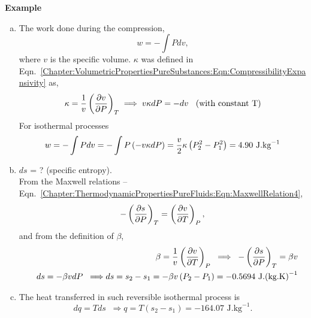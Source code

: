 \begin{MyExample}{\begin{center}{\bf Example}\end{center}}
       \begin{enumerate}[a)]
%
            \item The work done during the compression,
                \begin{displaymath}
                   w = -\int P dv,
                \end{displaymath}
                where $v$ is the specific volume. $\kappa$ was defined in Eqn.~\ref{Chapter:VolumetricPropertiesPureSubstances:Eqn:CompressibilityExpansivity} as,
                \begin{displaymath}
                   \kappa = \displaystyle\frac{1}{v}\left(\displaystyle\frac{\partial v}{\partial P}\right)_{T}\;\Longrightarrow \; v\kappa dP = - dv \;\;\text{ (with constant T)}
                \end{displaymath}
                For isothermal processes
                \begin{displaymath}
                   w = -\int P dv = - \int P\left(-v\kappa dP\right) = \displaystyle\frac{v}{2}\kappa\left(P_{2}^{2}-P_{1}^{2}\right) = 4.90\text{ J.kg}^{-1}
                \end{displaymath}
%
            \item $ds$ = ? (specific entropy).\\
                  From the Maxwell relations -- Eqn.~\ref{Chapter:ThermodynamicPropertiesPureFluids:Eqn:MaxwellRelation4}, 
                \begin{displaymath}
                   -\left(\displaystyle\frac{\partial s}{\partial P}\right)_{T} = \left(\displaystyle\frac{\partial v}{\partial T}\right)_{P},
                \end{displaymath}
                and from the definition of $\beta$,
                \begin{eqnarray}
                    && \beta = \displaystyle\frac{1}{v}\left(\displaystyle\frac{\partial v}{\partial T}\right)_{P} \;\;\Longrightarrow\;\; -\left(\displaystyle\frac{\partial s}{\partial P}\right)_{T} = \beta v \nonumber \\
                    && ds = -\beta v dP \;\;\Longrightarrow ds = s_{2}-s_{1} = -\beta v \left(P_{2}-P_{1}\right) = -0.5694 \text{ J.(kg.K)}^{-1} \nonumber
                \end{eqnarray}
%
            \item The heat transferred in such reversible isothermal process is
                \begin{displaymath}
                   dq = Tds \;\;\Longrightarrow q = T\left(s_{2}-s_{1}\right) = -164.07 \text{ J.kg}^{-1}.
                \end{displaymath}

\end{enumerate}
\end{MyExample}
